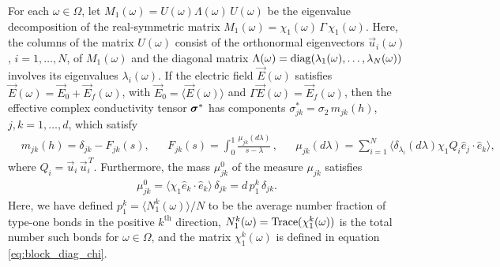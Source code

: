 \documentclass{cmslatex}
\newcommand\bsig{\mbox{\boldmath${\sigma}$}}
\begin{document}
\vspace{0.15in}
% 
\begin{theorem}\label{thm:Discrete_Spectral_Theorem_ACM}
  For each $\omega\in\Omega$, let $M_1(\omega)=U(\omega)\Lambda(\omega)\,U(\omega)$ be the eigenvalue
  decomposition of the real-symmetric matrix
  $M_1(\omega)=\chi_1(\omega)\,\Gamma\,\chi_1(\omega)$. Here, the columns of the matrix $U(\omega)$
  consist of the orthonormal eigenvectors $\vec{u}_i(\omega)$, $i=1,\ldots,N$,
  of $M_1(\omega)$ and the diagonal matrix $\Lambda(\omega)={\rm diag}(\lambda_1(\omega),\ldots,\lambda_N(\omega))$
  involves its eigenvalues $\lambda_i(\omega)$. If the electric field
  $\vec{E}(\omega)$ satisfies $\vec{E}(\omega)=\vec{E}_0+\vec{E}_f(\omega)$, with
  $\vec{E}_0=\langle\vec{E}(\omega)\rangle$ and $\Gamma\vec{E}(\omega)=\vec{E}_f(\omega)$, then the
  effective complex conductivity tensor $\bsig^*$ has components
  $\sigma_{jk}^*=\sigma_2\,m_{jk}(h)$, $j,k=1,\ldots,d$,  which satisfy       
%
\begin{align}\label{eq:Stieltjes_F_Discrete}
  &m_{jk}(h)=\delta_{jk}-F_{jk}(s), 
  &&F_{jk}(s)=\int_0^1\frac{\mu_{jk}(d\lambda)}{s-\lambda}\,, 
  &&\mu_{jk}(d\lambda)=\sum_{i=1}^N\langle \delta_{\lambda_i}(d\lambda)\chi_1Q_i\hat{e}_j\cdot\hat{e}_k\rangle,  
\end{align}
%
where $Q_i=\vec{u}_i\,\vec{u}_i^{\,T}$. Furthermore, the mass $\mu_{jk}^0$ of the
measure $\mu_{jk}$ satisfies 
%
\begin{align}\label{eq:Measure_Mass_theorem}
  \mu_{jk}^0=\langle\chi_1\hat{e}_k\cdot\hat{e}_k\rangle\,\delta_{jk}
       =d\,p_1^k\,\delta_{jk}.
\end{align}
%
Here, we have defined $p_1^k=\langle N_1^k(\omega)\rangle/N$ to be the average number
fraction of type-one bonds in the positive $k^{\text{th}}$ direction,
$N_1^k(\omega)={\rm Trace}(\chi_1^k(\omega))$ is the total number such bonds for
$\omega\in\Omega$, and the matrix $\chi_1^k(\omega)$ is defined in equation
\eqref{eq:block_diag_chi}.  
% 
\end{theorem}
\end{document}
